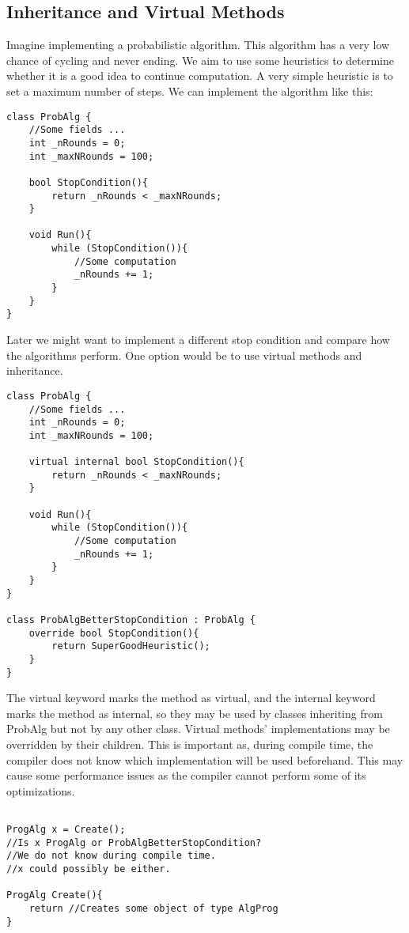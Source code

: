 \subsection{Inheritance and Virtual Methods}
Imagine implementing a probabilistic algorithm. This algorithm has a very low chance of cycling and never ending. We aim to use some heuristics to determine whether it is a good idea to continue computation. A very simple heuristic is to set a maximum number of steps. We can implement the algorithm like this:

\begin{lstlisting}
class ProbAlg {
    //Some fields ...
    int _nRounds = 0;
    int _maxNRounds = 100;

    bool StopCondition(){
        return _nRounds < _maxNRounds;
    }

    void Run(){
        while (StopCondition()){
            //Some computation 
            _nRounds += 1;
        }
    }
}
\end{lstlisting}

Later we might want to implement a different stop condition and compare how the algorithms perform. One option would be to use virtual methods and inheritance.

\begin{lstlisting}
class ProbAlg {
    //Some fields ...
    int _nRounds = 0;
    int _maxNRounds = 100;

    virtual internal bool StopCondition(){
        return _nRounds < _maxNRounds;
    }

    void Run(){
        while (StopCondition()){
            //Some computation 
            _nRounds += 1;
        }
    }
}

class ProbAlgBetterStopCondition : ProbAlg {
    override bool StopCondition(){
        return SuperGoodHeuristic();
    }
}
\end{lstlisting}

The virtual keyword marks the method as virtual, and the internal keyword marks the method as internal, so they may be used by classes inheriting from ProbAlg but not by any other class. Virtual methods' implementations may be overridden by their children. This is important as, during compile time, the compiler does not know which implementation will be used beforehand. This may cause some performance issues as the compiler cannot perform some of its optimizations.

\begin{lstlisting}

ProgAlg x = Create(); 
//Is x ProgAlg or ProbAlgBetterStopCondition? 
//We do not know during compile time. 
//x could possibly be either.

ProgAlg Create(){
    return //Creates some object of type AlgProg
}
\end{lstlisting}

